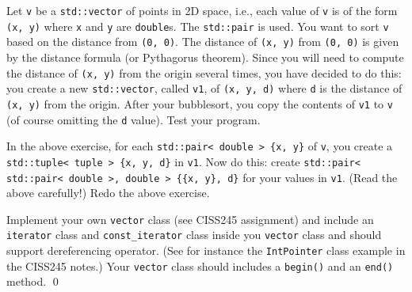 \begin{ex}
  Let \verb!v! be a \verb!std::vector! of points in 2D space, i.e.,
  each value of \verb!v! is of the form \verb!(x, y)! where \verb!x! and
  \verb!y! are \verb!double!s.
  The \verb!std::pair! is used.
  You want to sort \verb!v! based on the distance from \verb!(0, 0)!.
  The distance of \verb!(x, y)! from \verb!(0, 0)! is given by the distance
  formula (or Pythagorus theorem).
  Since you will need to compute the distance of \verb!(x, y)! from the
  origin several times, you have decided to do this:
  you create a new \verb!std::vector!, called \verb!v1!, of \verb!(x, y, d)!
  where \verb!d! is the distance of \verb!(x, y)! from the origin.
  After your bubblesort, you copy the contents of \verb!v1! to \verb!v! (of course omitting the
  \verb!d! value).
  Test your program.
\end{ex}

\begin{ex}
  In the above exercise, for each \verb!std::pair< double > {x, y}! of \verb!v!,
  you create a \verb!std::tuple< tuple > {x, y, d}! in \verb!v1!.
  Now do this: create
  \verb!std::pair< std::pair< double >, double > {{x, y}, d}! for your values in \verb!v1!.
  (Read the above carefully!)
  Redo the above exercise.
\end{ex}

\begin{ex}
  Implement your own \verb!vector! class (see CISS245 assignment) and include
  an \verb!iterator! class
  and
  \verb!const_iterator! class
  inside you
  \verb!vector! class
  and should support dereferencing operator. 
  (See for instance the \verb!IntPointer! class
  example in the CISS245 notes.)
  Your \verb!vector! class should includes a
  \verb!begin()! and an \verb!end()! method.
  \qed
\end{ex}

